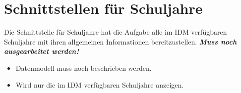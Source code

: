 \section{Schnittstellen für Schuljahre}
Die Schnittstelle für Schuljahre hat die Aufgabe alle im IDM verfügbaren Schuljahre mit ihren allgemeinen Informationen bereitzustellen.
\textbf{\emph{\textcolor[rgb]{1,0,0}{Muss noch ausgearbeitet werden!}}}
\begin{itemize}
	\item Datenmodell muss noch beschrieben werden.
	\item Wird nur die im IDM verfügbaren Schuljahre anzeigen.
\end{itemize}




